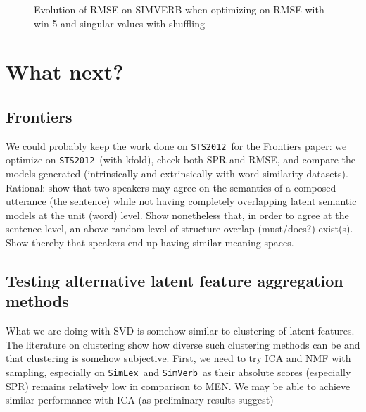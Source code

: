 \documentclass[utf8]{article}
\newcommand\simlex{\texttt{SimLex}}
\newcommand\simverb{\texttt{SimVerb}}
\newcommand\sts{\texttt{STS2012}}
\begin{document}
\begin{figure}[H]
\begin{minipage}[t]{.48\linewidth}
{
  }
  \caption{Evolution of RMSE on SIMVERB when optimizing on RMSE with win-5 and singular values with shuffling}
   \end{minipage}
\end{figure}

\section{What next?}

\subsection{Frontiers}
We could probably keep the work done on \sts\ for the Frontiers paper: we optimize on \sts\ (with kfold), check both SPR and RMSE, and compare the models generated (intrinsically and extrinsically with word similarity datasets).
Rational: show that two speakers may agree on the semantics of a composed utterance (the sentence) while not having completely overlapping latent semantic models at the unit (word) level. Show nonetheless that, in order to agree at the sentence level, an above-random level of structure overlap (must/does?) exist(s). Show thereby that speakers end up having similar meaning spaces.

\subsection{Testing alternative latent feature aggregation methods}
What we are doing with SVD is somehow similar to clustering of latent features.
The literature on clustering show how diverse such clustering methods can be and that clustering is somehow subjective. First, we need to try ICA and NMF with sampling, especially on \simlex\ and \simverb\ as their absolute scores (especially SPR) remains relatively low in comparison to MEN. We may be able to achieve similar performance with ICA (as preliminary results suggest)
\end{document}
